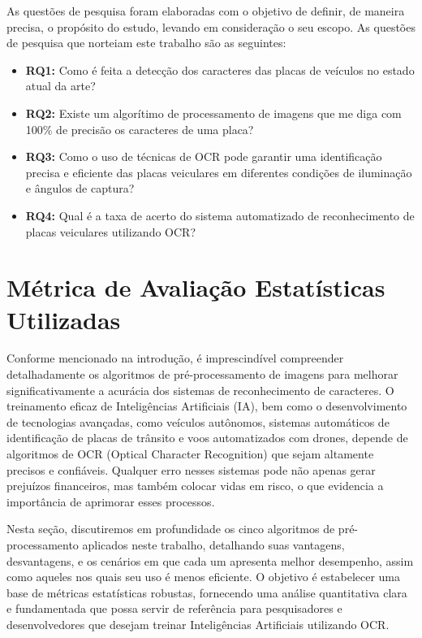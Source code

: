 \documentclass[conference]{IEEEtran}
\begin{document}
As questões de pesquisa foram elaboradas com o objetivo de definir, de maneira precisa, o propósito do estudo, levando em consideração o seu escopo. As questões de pesquisa que norteiam este trabalho são as seguintes:

\begin{itemize}
	\item \textbf{RQ1:} Como é feita a detecção dos caracteres das placas de veículos no estado atual da arte?
	\item \textbf{RQ2:} Existe um algorítimo de processamento de imagens que me diga com 100\% de precisão os caracteres de uma placa?
	\item \textbf{RQ3:} Como o uso de técnicas de OCR pode garantir uma identificação precisa e eficiente das placas veiculares em diferentes condições de iluminação e ângulos de captura?
	\item \textbf{RQ4:} Qual é a taxa de acerto do sistema automatizado de reconhecimento de placas veiculares utilizando OCR?
\end{itemize}

\section{Métrica de Avaliação Estatísticas Utilizadas}

Conforme mencionado na introdução, é imprescindível compreender detalhadamente os algoritmos de pré-processamento de imagens para melhorar significativamente a acurácia dos sistemas de reconhecimento de caracteres. O treinamento eficaz de Inteligências Artificiais (IA), bem como o desenvolvimento de tecnologias avançadas, como veículos autônomos, sistemas automáticos de identificação de placas de trânsito e voos automatizados com drones, depende de algoritmos de OCR (Optical Character Recognition) que sejam altamente precisos e confiáveis. Qualquer erro nesses sistemas pode não apenas gerar prejuízos financeiros, mas também colocar vidas em risco, o que evidencia a importância de aprimorar esses processos.

Nesta seção, discutiremos em profundidade os cinco algoritmos de pré-processamento aplicados neste trabalho, detalhando suas vantagens, desvantagens, e os cenários em que cada um apresenta melhor desempenho, assim como aqueles nos quais seu uso é menos eficiente. O objetivo é estabelecer uma base de métricas estatísticas robustas, fornecendo uma análise quantitativa clara e fundamentada que possa servir de referência para pesquisadores e desenvolvedores que desejam treinar Inteligências Artificiais utilizando OCR.
\end{document}
